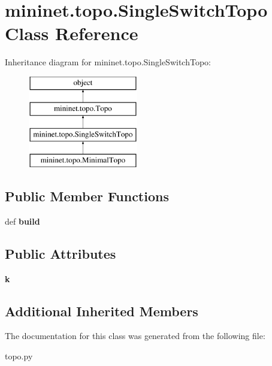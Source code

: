 \hypertarget{classmininet_1_1topo_1_1SingleSwitchTopo}{\section{mininet.\-topo.\-Single\-Switch\-Topo Class Reference}
\label{classmininet_1_1topo_1_1SingleSwitchTopo}
}
Inheritance diagram for mininet.\-topo.\-Single\-Switch\-Topo\-:\begin{figure}[H]
\begin{center}
\leavevmode
\includegraphics[height=4.000000cm]{classmininet_1_1topo_1_1SingleSwitchTopo}
\end{center}
\end{figure}
\subsection*{Public Member Functions}
\begin{DoxyCompactItemize}
\item 
\hypertarget{classmininet_1_1topo_1_1SingleSwitchTopo_a0b1bf95d0acf7350e732d74a01b1bbf0}{def {\bfseries build}}\label{classmininet_1_1topo_1_1SingleSwitchTopo_a0b1bf95d0acf7350e732d74a01b1bbf0}

\end{DoxyCompactItemize}
\subsection*{Public Attributes}
\begin{DoxyCompactItemize}
\item 
\hypertarget{classmininet_1_1topo_1_1SingleSwitchTopo_ad6f6c3126fe3c129a6b2ab2b8f1714d8}{{\bfseries k}}\label{classmininet_1_1topo_1_1SingleSwitchTopo_ad6f6c3126fe3c129a6b2ab2b8f1714d8}

\end{DoxyCompactItemize}
\subsection*{Additional Inherited Members}


The documentation for this class was generated from the following file\-:\begin{DoxyCompactItemize}
\item 
topo.\-py\end{DoxyCompactItemize}
